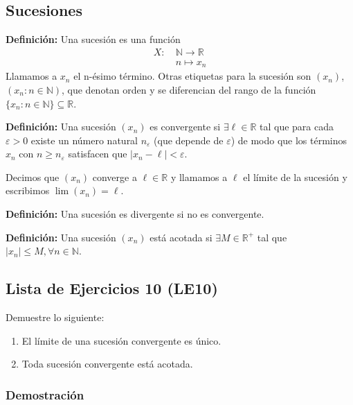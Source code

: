 \documentclass[11pt]{article}
\newcommand{\N}{\mathbb{N}}
\newcommand{\R}{\mathbb{R}}
\begin{document}
\subsection*{Sucesiones}

\textbf{Definición:} Una sucesión es una función %
\begin{align*}
    X: \ & \N \to \R \\
    \ &  n \mapsto x_n 
\end{align*}
%
Llamamos a $x_n$ el n-ésimo término. Otras etiquetas para la sucesión son $(x_n)$, $(x_n:n\in \N)$, que denotan orden y se diferencian del rango de la función $\{x_n:n\in \N\}\subseteq \R$.

\textbf{Definición:} Una sucesión $(x_n)$ es convergente si $\exists \ell \in \R$ tal que para cada $\varepsilon>0$ existe un número natural $n_\varepsilon$ (que depende de $\varepsilon$) de modo que los términos $x_n$ con $n\geq n_\varepsilon$ satisfacen que $|x_n-\ell|<\varepsilon$.

Decimos que $(x_n)$ converge a $\ell \in \R$ y llamamos a $\ell$ el límite de la sucesión y escribimos $\lim (x_n) = \ell$.

\textbf{Definición:} Una sucesión es divergente si no es convergente.

\textbf{Definición:} Una sucesión $(x_n)$ está acotada si $\exists M\in \R^+$ tal que $|x_n|\leq M, \forall n\in \N$.

\subsection*{Lista de Ejercicios 10 (LE10)}

Demuestre lo siguiente:

\begin{enumerate}[label=\alph*)]
    \item El límite de una sucesión convergente es único.
    \item Toda sucesión convergente está acotada.
\end{enumerate}

\subsubsection*{Demostración}
\end{document}
